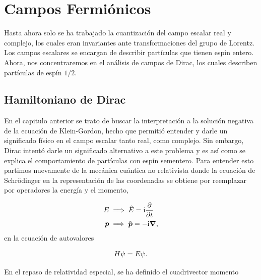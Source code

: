

\chapter{Campos Fermiónicos} 

\label{capitulo_4}

Hasta ahora solo se ha trabajado la cuantización del campo escalar real y complejo, los cuales eran invariantes ante transformaciones del grupo de Lorentz. Los campos escalares se encargan de describir partículas que tienen espín entero. Ahora, nos concentraremos en el análisis de campos de Dirac, los cuales describen partículas de espín $1/2$.

\section{Hamiltoniano de Dirac}

En el capitulo anterior se trato de buscar la interpretación a la solución negativa de la ecuación de Klein-Gordon, hecho que permitió entender y darle un significado físico en el campo escalar tanto real, como complejo. Sin embargo, Dirac intentó darle un significado alternativo a este problema y es así como se explica el comportamiento de partículas con espín sementero. Para entender esto partimos nuevamente de la mecánica cuántica no relativista donde la ecuación de Schrödinger en la representación de las coordenadas se obtiene por reemplazar por operadores la energía y el momento, 

\begin{equation}
	\begin{split}
		E &\implies \hat{E} = \mathrm{i} \pdv{t}\\
		\vb*{p} & \implies \hat{\vb*{p}} = - \mathrm{i} \grad,
	\end{split}
	\label{eq_4.1}
\end{equation}
en la ecuación de autovalores 

\begin{equation}
	H \psi = E \psi. 
	\label{eq_4.2}
\end{equation}

En el repaso de relatividad especial, se ha definido el cuadrivector momento 

